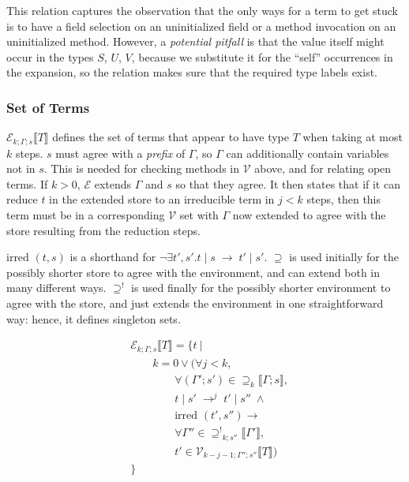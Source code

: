 \documentclass[9pt]{sigplanconf}
\newcommand{\gap}{\quad\quad}
\newcommand{\reduces}{\;\rightarrow\;}
\newcommand{\reduction}[4]{#1 \operatorname{|} #2 \reduces #3 \operatorname{|} #4}
\newcommand{\relv}[4]{\mathcal{V}_{#1;#2;#3}\llbracket#4\rrbracket}
\newcommand{\rele}[4]{\mathcal{E}_{#1;#2;#3}\llbracket#4\rrbracket}
\newcommand{\rels}[3]{\mathcal{\supseteq}_{#1}\llbracket#2;#3\rrbracket}
\newcommand{\relg}[3]{\mathcal{\supseteq^!}_{#1;#2}\llbracket#3\rrbracket}
\newcommand{\irred}[2]{\text{irred }(#1,#2)}
\newcommand{\andl}{\;\wedge\;}
\newcommand{\orl}{\vee}
\newcommand{\impliesl}{\rightarrow}
\newcommand{\reductionl}[5]{#1 \operatorname{|} #2 \;\rightarrow^{#5}\; #3 \operatorname{|} #4}
\begin{document}
This relation captures the observation that the only ways for a term
to get stuck is to have a field selection on an uninitialized field or
a method invocation on an uninitialized method. However, a {\it potential
  pitfall} is that the value itself might occur in the types $S$, $U$,
$V$, because we substitute it for the ``self'' occurrences in the
expansion, so the relation makes sure that the required type labels exist.

\subsubsection{Set of Terms}
$\rele k \Gamma s T$ defines the set of terms that appear to have type
$T$ when taking at most $k$ steps. $s$ must agree with a {\it prefix}
of $\Gamma$, so $\Gamma$ can additionally contain variables not in
$s$. This is needed for checking methods in $\mathcal{V}$ above, and
for relating open terms. If $k > 0$, $\mathcal{E}$ extends $\Gamma$
and $s$ so that they agree. It then states that if it can reduce $t$
in the extended store to an irreducible term in $j < k$ steps, then
this term must be in a corresponding $\mathcal{V}$ set with $\Gamma$
now extended to agree with the store resulting from the reduction
steps.

$\irred {t} {s}$ is a shorthand for $\neg\exists t', s'. \reduction t s
{t'} {s'}$. $\mathcal{\supseteq}$ is used initially for the possibly
shorter store to agree with the environment, and can extend both in
many different ways. $\mathcal{\supseteq}^!$ is used finally for the
possibly shorter environment to agree with the store, and just extends
the environment in one straightforward way: hence, it defines
singleton sets.

\begin{align*}
&\rele k \Gamma s T = \{ t \ |\\
&\gap k = 0 \orl (\forall j < k,\\
&\gap\gap \forall (\Gamma'; s') \in \rels k \Gamma s ,\\
&\gap\gap \reductionl t {s'} {t'} {s''} j \andl\\
&\gap\gap \irred {t'} {s''} \impliesl\\
&\gap\gap \forall \Gamma'' \in \relg k {s''} {\Gamma'} ,\\
&\gap\gap {t'} \in \relv {k-j-1} {\Gamma''} {s''} T)\\
&\}
\end{align*}
\end{document}
